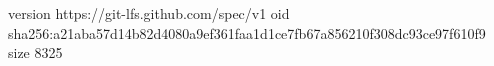 version https://git-lfs.github.com/spec/v1
oid sha256:a21aba57d14b82d4080a9ef361faa1d1ce7fb67a856210f308dc93ce97f610f9
size 8325
